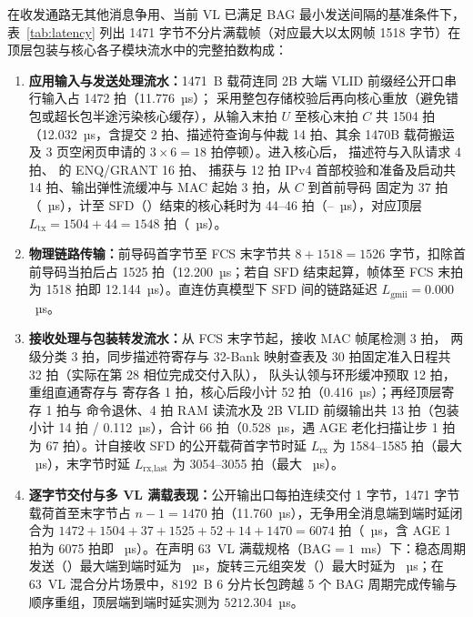 在收发通路无其他消息争用、当前 VL 已满足 BAG 最小发送间隔的基准条件下，表~\ref{tab:latency} 列出 1471 字节不分片满载帧（对应最大以太网帧 1518 字节）在顶层包装与核心各子模块流水中的完整拍数构成：
\begin{enumerate}[leftmargin=2em,itemsep=1pt]
  \item \textbf{应用输入与发送处理流水：}1471~B 载荷连同 2B 大端 VLID 前缀经公开口串行输入占 1472 拍（11.776~µs）； 采用整包存储校验后再向核心重放（避免错包或超长包半途污染核心缓存），从输入末拍 $U$ 至核心末拍 $C$ 共 1504 拍（12.032~µs，含提交 2 拍、描述符查询与仲裁 14 拍、其余 1470B 载荷搬运及 3 页空闲页申请的 $3\times 6=18$ 拍停顿）。进入核心后， 描述符与入队请求 4 拍、 的 ENQ/GRANT 16 拍、 捕获与 12 拍 IPv4 首部校验和准备及启动共 14 拍、输出弹性流缓冲与 MAC 起始 3 拍，从 $C$ 到首前导码  固定为 37 拍（\TtxSof~µs），计至 SFD（）结束的核心耗时为 44--46 拍（\TtxCore--\TtxCoreMax~µs），对应顶层 $L_\text{tx}=1504+44=1548$ 拍（\Ttx~µs）。
  \item \textbf{物理链路传输：}前导码首字节至 FCS 末字节共 $8 + 1518 = 1526$ 字节，扣除首前导码当拍后占 1525 拍（12.200~µs；若自 SFD 结束起算，帧体至 FCS 末拍为 1518 拍即 12.144~µs）。直连仿真模型下 SFD 间的链路延迟 $L_\text{gmii} = 0.000$~µs。
  \item \textbf{接收处理与包装转发流水：}从 FCS 末字节起，接收 MAC 帧尾检测 3 拍， 两级分类 3 拍，同步描述符寄存与 32-Bank 映射查表及 30 拍固定准入日程共 32 拍（实际在第 28 相位完成交付入队）， 队头认领与环形缓冲预取 12 拍，重组直通寄存与  寄存各 1 拍，核心后段小计 52 拍（0.416~µs）；再经顶层寄存 1 拍与  命令退休、4 拍 RAM 读流水及 2B VLID 前缀输出共 13 拍（包装小计 14 拍 / 0.112~µs），合计 66 拍（0.528~µs，遇 AGE 老化扫描让步 1 拍为 67 拍）。计自接收 SFD 的公开载荷首字节时延 $L_\text{rx}$ 为 1584--1585 拍（最大 \Trx~µs），末字节时延 $L_\text{rx,last}$ 为 3054--3055 拍（最大 \TrxLast~µs）。
  \item \textbf{逐字节交付与多 VL 满载表现：}公开输出口每拍连续交付 1 字节，1471 字节载荷首至末字节占 $n-1 = 1470$ 拍（11.760~µs），无争用全消息端到端时延闭合为 $1472+1504+37+1525+52+14+1470=6074$ 拍（\LatAvg~µs，含 AGE 1 拍为 6075 拍即 \Lat~µs）。在声明 63~VL 满载规格（$\text{BAG}=1$~ms）下：稳态周期发送（）最大端到端时延为 \LatSixtyThreePMax~µs，旋转三元组突发（）最大时延为 \LatSixtyThreeBTwo~µs；在 63~VL 混合分片场景中，$8192$~B 6 分片长包跨越 5 个 BAG 周期完成传输与顺序重组，顶层端到端时延实测为 $5212.304$~µs。
\end{enumerate}

